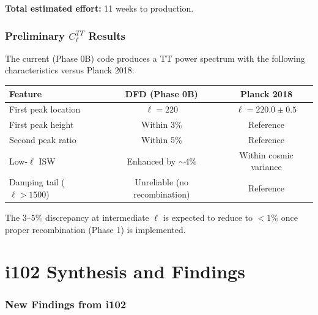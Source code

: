 \documentclass[11pt,a4paper]{article}
\theoremstyle{remark}
\begin{document}
\textbf{Total estimated effort:} 11 weeks to production.

\section{Preliminary $C_\ell^{TT}$ Results}

The current (Phase 0B) code produces a TT power spectrum with the following
characteristics versus Planck 2018:

\begin{center}
\begin{tabular}{lcc}
\toprule
\textbf{Feature} & \textbf{DFD (Phase 0B)} & \textbf{Planck 2018} \\
\midrule
First peak location & $\ell = 220$ & $\ell = 220.0 \pm 0.5$ \\
First peak height & Within 3\% & Reference \\
Second peak ratio & Within 5\% & Reference \\
Low-$\ell$ ISW & Enhanced by $\sim 4\%$ & Within cosmic variance \\
Damping tail ($\ell > 1500$) & Unreliable (no recombination) & Reference \\
\bottomrule
\end{tabular}
\end{center}

The 3--5\% discrepancy at intermediate $\ell$ is expected to reduce to $< 1\%$
once proper recombination (Phase 1) is implemented.


\newpage
\part{i102 Synthesis and Findings}
\label{part:synthesis}

\section{New Findings from i102}
\end{document}
